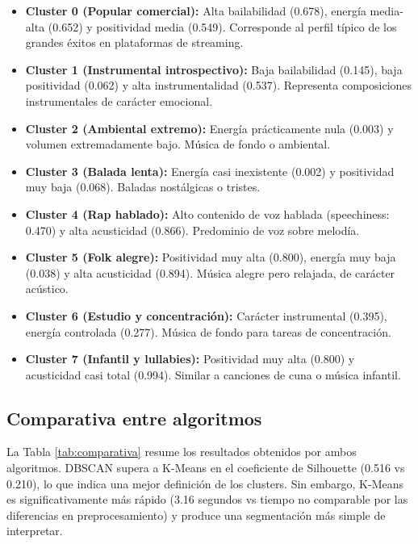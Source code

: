 \begin{itemize}
    \item \textbf{Cluster 0 (Popular comercial):} Alta bailabilidad (0.678), energía media-alta (0.652) y positividad media (0.549). Corresponde al perfil típico de los grandes éxitos en plataformas de streaming.
    
    \item \textbf{Cluster 1 (Instrumental introspectivo):} Baja bailabilidad (0.145), baja positividad (0.062) y alta instrumentalidad (0.537). Representa composiciones instrumentales de carácter emocional.
    
    \item \textbf{Cluster 2 (Ambiental extremo):} Energía prácticamente nula (0.003) y volumen extremadamente bajo. Música de fondo o ambiental.
    
    \item \textbf{Cluster 3 (Balada lenta):} Energía casi inexistente (0.002) y positividad muy baja (0.068). Baladas nostálgicas o tristes.
    
    \item \textbf{Cluster 4 (Rap hablado):} Alto contenido de voz hablada (speechiness: 0.470) y alta acusticidad (0.866). Predominio de voz sobre melodía.
    
    \item \textbf{Cluster 5 (Folk alegre):} Positividad muy alta (0.800), energía muy baja (0.038) y alta acusticidad (0.894). Música alegre pero relajada, de carácter acústico.
    
    \item \textbf{Cluster 6 (Estudio y concentración):} Carácter instrumental (0.395), energía controlada (0.277). Música de fondo para tareas de concentración.
    
    \item \textbf{Cluster 7 (Infantil y lullabies):} Positividad muy alta (0.800) y acusticidad casi total (0.994). Similar a canciones de cuna o música infantil.
\end{itemize}

\subsection{Comparativa entre algoritmos}

La Tabla \ref{tab:comparativa} resume los resultados obtenidos por ambos algoritmos. DBSCAN supera a K-Means en el coeficiente de Silhouette (0.516 vs 0.210), lo que indica una mejor definición de los clusters. Sin embargo, K-Means es significativamente más rápido (3.16 segundos vs tiempo no comparable por las diferencias en preprocesamiento) y produce una segmentación más simple de interpretar.

